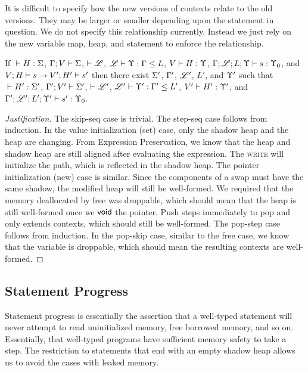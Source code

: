 It is difficult to specify how the new versions of contexts relate to the old versions.
They may be larger or smaller depending upon the statement in question.
We do not specify this relationship currently.
Instead we just rely on the new variable map, heap, and statement to enforce
the relationship.

\begin{conj}
  \raggedright
  If ${} \vdash {H} : {\Sigma}$, $\Gamma;V\vdash\Sigma$, $\vdash\mathscr{L}$, ${\mathscr{L}} \vdash {\Upsilon} : {\Gamma} \leq {L}$,
  ${V} \vdash {H} : {\Upsilon}$, ${\Gamma;\mathscr{L};L;\Upsilon} \vdash {s} : {\Upsilon_0}$, and ${V};{H}\vdash{s}\to{V'};{H'}\vdash{s'}$
  then there exist $\Sigma'$, $\Gamma'$, $\mathscr{L}'$, $L'$, and $\Upsilon'$ such that
  ${} \vdash {H'} : {\Sigma'}$, $\Gamma';V'\vdash\Sigma'$, $\vdash\mathscr{L}'$, ${\mathscr{L}'} \vdash {\Upsilon'} : {\Gamma'} \leq {L'}$,
  ${V'} \vdash {H'} : {\Upsilon'}$, and ${\Gamma';\mathscr{L}';L';\Upsilon'} \vdash {s'} : {\Upsilon_0}$.

\end{conj}

\begin{proof}[Justification]
  The skip-seq case is trivial.
  The step-seq case follows from induction.
  In the value initialization (set) case, only the shadow heap and the heap are changing.
  From Expression Preservation, we know that the heap and shadow heap are still aligned
  after evaluating the expression. The \textsc{write} will initialize the path, which
  is reflected in the shadow heap.
  The pointer initialization (new) case is similar.
  Since the components of a swap must have the same shadow, the modified heap will
  still be well-formed.
  We required that the memory deallocated by \textsf{free} was droppable, which
  should mean that the heap is still well-formed once we $\mathsf{void}$ the pointer.
  Push steps immediately to pop and only extends contexts, which should still be well-formed.
  The pop-step case follows from induction.
  In the pop-skip case, similar to the \textsf{free} case, we know that the variable
  is droppable, which should mean the resulting contexts are well-formed.
\end{proof}

\subsection*{Statement Progress}
Statement progress is essentially the assertion that a well-typed statement will
never attempt to read uninitialized memory, free borrowed memory, and so on.
Essentially, that well-typed programs have sufficient memory safety to take a step.
The restriction to statements that end with an empty shadow heap allows us
to avoid the cases with leaked memory.

